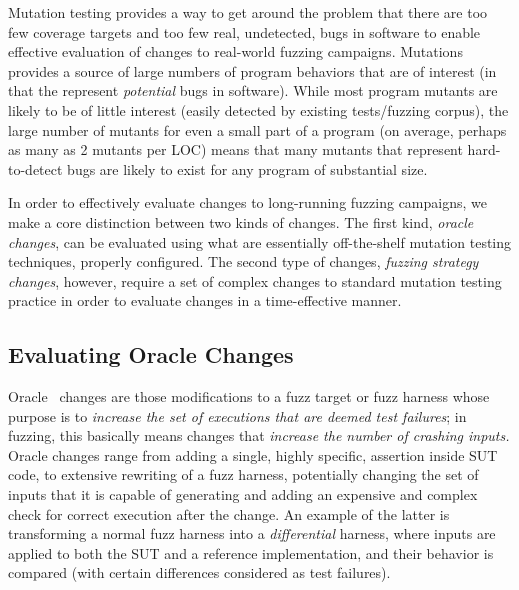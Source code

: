 Mutation testing provides a way to get around the problem that there are too few coverage targets and too few real, undetected, bugs in software to enable effective evaluation of changes to real-world fuzzing campaigns.  Mutations provides a source of large numbers of program behaviors that are of interest (in that the represent \emph{potential} bugs in software).  While most program mutants are likely to be of little interest (easily detected by existing tests/fuzzing corpus), the large number of mutants for even a small part of a program (on average, perhaps as many as 2 mutants per LOC) means that many mutants that represent hard-to-detect bugs are likely to exist for any program of substantial size.
  
In order to effectively evaluate changes to long-running fuzzing campaigns, we make a core distinction between two kinds of changes.  The first kind, \emph{oracle changes}, can be evaluated using what are essentially off-the-shelf mutation testing techniques, properly configured.  The second type of changes, \emph{fuzzing strategy changes}, however, require a set of complex changes to standard mutation testing practice in order to evaluate changes in a time-effective manner.

\subsection{Evaluating Oracle Changes}

Oracle~\cite{Barr2015,Staats:2011:PTO:1985793.1985847} changes are those modifications to a fuzz target or fuzz harness whose purpose is to \emph{increase the set of executions that are deemed test failures}; in fuzzing, this basically means changes that \emph{increase the number of crashing inputs.}  Oracle changes range from adding a single, highly specific, assertion inside SUT code, to extensive rewriting of a fuzz harness, potentially changing the set of inputs that it is capable of generating and adding an expensive and complex check for correct execution after the change.   An example of the latter is transforming a normal fuzz harness into a \emph{differential}\cite{Differential} harness, where inputs are applied to both the SUT and a reference implementation, and their behavior is compared (with certain differences considered as test failures).

